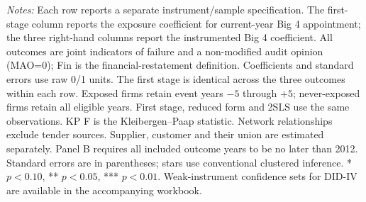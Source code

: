 \documentclass[10pt]{article}
\begin{document}
\begin{minipage}{23.60cm}
\begin{tabular*}{\linewidth}{@{\extracolsep{\fill}}lccccccc@{}}
\bottomrule\end{tabular*}\par\medskip
\fontsize{9}{11}\selectfont\textit{Notes:} Each row reports a separate instrument/sample specification. The first-stage column reports the exposure coefficient for current-year Big 4 appointment; the three right-hand columns report the instrumented Big 4 coefficient. All outcomes are joint indicators of failure and a non-modified audit opinion (MAO=0); Fin is the financial-restatement definition. Coefficients and standard errors use raw 0/1 units. The first stage is identical across the three outcomes within each row.
Exposed firms retain event years $-5$ through $+5$; never-exposed firms retain all eligible years. First stage, reduced form and 2SLS use the same observations. KP F is the Kleibergen--Paap statistic.
Network relationships exclude tender sources. Supplier, customer and their union are estimated separately.
Panel B requires all included outcome years to be no later than 2012. Standard errors are in parentheses; stars use conventional clustered inference. * $p<0.10$, ** $p<0.05$, *** $p<0.01$. Weak-instrument confidence sets for DID-IV are available in the accompanying workbook.
\end{minipage}
\end{document}
